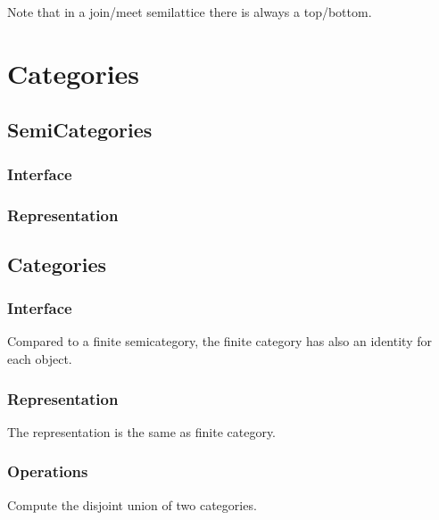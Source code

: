 


Note that in a join/meet semilattice there is always a top/bottom.


\chapter{Categories}


\section{SemiCategories}
\subsection*{Interface}

\subsection*{Representation}


\section{Categories}
\subsection*{Interface}
Compared to a finite semicategory, the finite category
has also an identity for each object.

\subsection*{Representation}

The representation is the same as finite category.

\subsection*{Operations}

\begin{gradedexercise}
Compute the disjoint union of two categories.

\end{gradedexercise}

